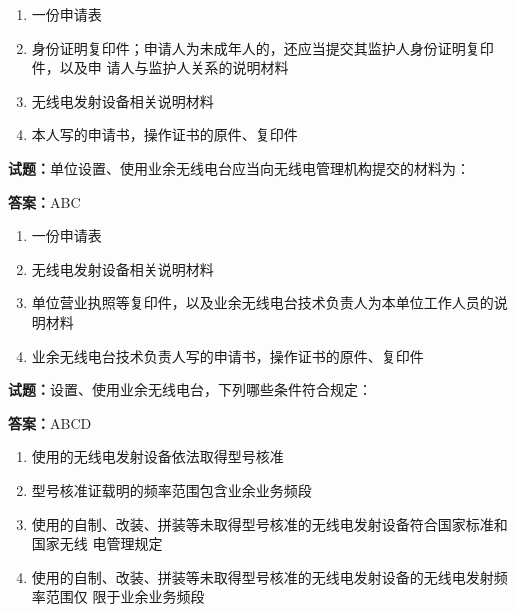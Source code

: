 \documentclass{ctexbook}
\begin{document}
\begin{enumerate}[leftmargin=3em]
  \item 一份申请表 

  \item 身份证明复印件；申请人为未成年人的，还应当提交其监护人身份证明复印件，以及申
请人与监护人关系的说明材料 

  \item 无线电发射设备相关说明材料 

  \item 本人写的申请书，操作证书的原件、复印件 

\end{enumerate}





\vspace{1em}

\textbf{试题：}单位设置、使用业余无线电台应当向无线电管理机构提交的材料为： 

\textbf{答案：}ABC 

\begin{enumerate}[leftmargin=3em]
  \item 一份申请表 

  \item 无线电发射设备相关说明材料 

  \item 单位营业执照等复印件，以及业余无线电台技术负责人为本单位工作人员的说明材料 

  \item 业余无线电台技术负责人写的申请书，操作证书的原件、复印件 

\end{enumerate}





\vspace{1em}

\textbf{试题：}设置、使用业余无线电台，下列哪些条件符合规定： 

\textbf{答案：}ABCD 

\begin{enumerate}[leftmargin=3em]
  \item 使用的无线电发射设备依法取得型号核准 

  \item 型号核准证载明的频率范围包含业余业务频段 

  \item 使用的自制、改装、拼装等未取得型号核准的无线电发射设备符合国家标准和国家无线
电管理规定 

  \item 使用的自制、改装、拼装等未取得型号核准的无线电发射设备的无线电发射频率范围仅
限于业余业务频段 

\end{enumerate}
\end{document}
